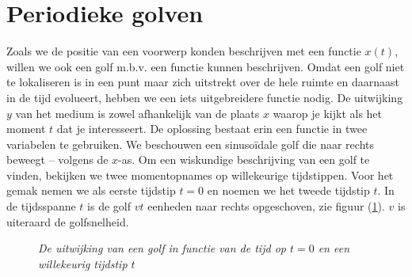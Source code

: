 
\section{Periodieke golven}

Zoals we de positie van een voorwerp konden beschrijven met een functie $x(t)$, willen we ook een golf m.b.v. een functie kunnen beschrijven. Omdat een golf niet te lokaliseren is in een punt maar zich uitstrekt over de hele ruimte en daarnaast in de tijd evolueert, hebben we een iets uitgebreidere functie nodig. De uitwijking $y$ van het medium is zowel afhankelijk van de plaats $x$ waarop je kijkt als het moment $t$ dat je interesseert. De oplossing bestaat erin een functie in twee variabelen te gebruiken. 
\newline
\newline
We beschouwen een sinuso\"idale golf die naar rechts beweegt -- volgens de $x$-as. Om een wiskundige beschrijving van een golf te vinden, bekijken we twee momentopnames op willekeurige tijdstippen. Voor het gemak nemen we als eerste tijdstip $t=0$ en noemen we het tweede tijdstip $t$. In de tijdsspanne $t$ is de golf $vt$ eenheden naar rechts opgeschoven, zie figuur (\ref{afleiding_golfvergelijking}). $v$ is uiteraard de golfsnelheid.

\begin{figure}[!h]
\centering


\caption{\emph{De uitwijking van een golf in functie van de tijd op $t=0$ en een willekeurig tijdstip $t$}}\label{afleiding_golfvergelijking}
\end{figure}

